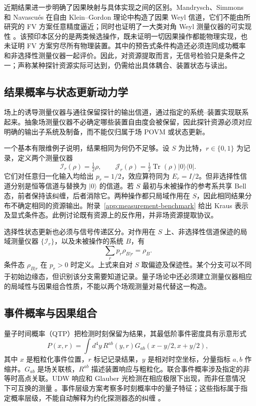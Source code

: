 \documentclass[UTF8,11pt,a4paper,fontset=none]{ctexart}
\newcommand{\Tr}{\operatorname{Tr}}
\begin{document}
近期结果进一步明确了因果映射与具体实现之间的区别。Mandrysch、Simmons 和 Navascu\'es 在自由 Klein--Gordon 理论中构造了因果 Weyl 信道，它们不能由所研究的 FV 方案任意精度逼近；同时也证明了一大类对角 Weyl 测量仪器的可实现性 \cite{MandryschSimmonsNavascues2026}。该预印本区分的是两类候选操作，既未证明一切因果操作都能物理实现，也未证明 FV 方案穷尽所有物理装置。其中的预告式条件构造还必须连同成功概率和非选择性测量仪器一起评价。因此，对资源提取而言，无信号检验只是条件之一；声称某种探针资源实际可达到，仍需给出具体耦合、装置状态与读出。

\subsection{结果概率与状态更新动力学}
场上的诱导测量仪器与通往保留探针的输出信道，通过指定的系统--装置实现联系起来。抽象场测量仪器不必确定哪些装置自由度会被保留，因此探针资源必须对应明确的输出子系统及制备，而不能仅归属于场 POVM 或状态更新。

一个基本有限维例子说明，结果相同为何仍不足够。设 $S$ 为比特，$r\in\{0,1\}$ 为记录，定义两个测量仪器
\begin{equation}
\mathcal I_r(\rho)=\tfrac12\rho,\qquad
\mathcal J_r(\rho)=\tfrac12\Tr(\rho)|0\rangle\langle0|.
\label{eq:instrument-same-probability}
\end{equation}
它们对任意归一化输入均给出 $p_r=1/2$，效应算符同为 $E_r=I/2$。但非选择性信道分别是恒等信道与替换为 $|0\rangle$ 的信道。若 $S$ 最初与未被操作的参考系共享 Bell 态，前者保持该纠缠，后者消除它。两种操作都只局域作用在 $S$，因此相同结果分布不确定相同的资源输出。附录~\ref{app:measurement-benchmark} 给出 Kraus 表示及显式条件态。此例讨论既有资源上的反作用，并非场资源提取协议。

选择性状态更新也必须与信号传递区分。对作用在 $S$ 上、非选择性信道保迹的局域测量仪器 $\{\mathcal I_r\}$，以及未被操作的系统 $B$，有
\begin{equation}
\sum_r p_r\rho_{B|r}=\rho_B.
\label{eq:selective-nonselective}
\end{equation}
条件态 $\rho_{B|r}$ 在 $p_r>0$ 时定义。上式来自对 $S$ 取偏迹及保迹性。某个分支可以不同于初始边缘态，但识别该分支需要知道记录。量子场论中还必须建立测量仪器相应的局域性与因果组合性质，不能以两个场观测量对易代替这一构造。

\subsection{事件概率与因果组合}
量子时间概率（QTP）把检测时刻保留为结果，其最低阶事件密度具有示意形式
\begin{equation}
P(x,r)=\int d^4y\,R^{ab}(y,r)
G_{ab}(x-y/2,x+y/2),
\label{eq:qtp}
\end{equation}
其中 $x$ 是粗粒化事件位置，$r$ 标记记录结果，$y$ 是相对时空坐标，分量指标 $a,b$ 作缩并。$G_{ab}$ 是场关联核，$R^{ab}$ 描述装置响应与粗粒化。联合事件概率涉及指定的非等时高点关联。UDW 响应和 Glauber 光检测在相应极限下出现，而非任意情况下可互换的测量 \cite{AnastopoulosSavvidou2012,AnastopoulosSavvidou2019,AnastopoulosHuSavvidou2023,Koliopoulou2026}。事件层级方案考察多时刻概率中的量子特征；这些指标属于指定概率层级，不能自动解释为约化探测器态的纠缠 \cite{AnastopoulosSavvidou2025}。
\end{document}
